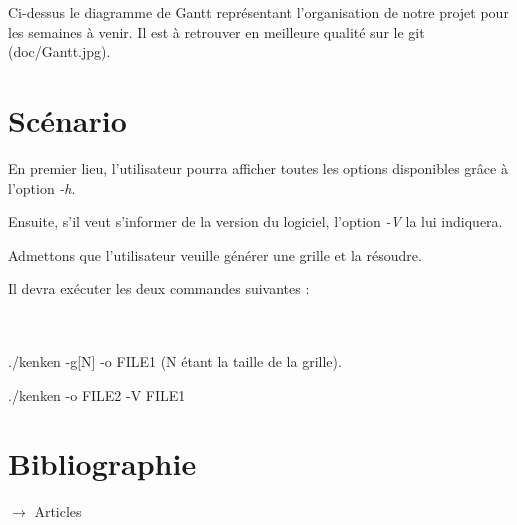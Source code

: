 \documentclass[1]{report}
\begin{document}
    \quad Ci-dessus le diagramme de Gantt représentant l'organisation de notre projet pour les semaines à venir. Il est à retrouver en meilleure qualité sur le git (doc/Gantt.jpg).


\chapter{Scénario}

		En premier lieu, l'utilisateur pourra afficher toutes les options disponibles grâce à l'option \emph{-h}.

		Ensuite, s'il veut s'informer de la version du logiciel, l'option \emph{-V} la lui indiquera.

		Admettons que l'utilisateur veuille générer une grille et la résoudre.

		Il devra exécuter les deux commandes suivantes :

\\~\\

	./kenken -g[N] -o FILE1 (N étant la taille de la grille).



	./kenken -o FILE2 -V FILE1


\chapter{Bibliographie}

    $\rightarrow$ Articles \\
\end{document}
